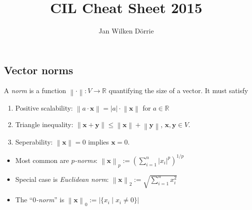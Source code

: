 \documentclass[11pt,a4paper,technote]{IEEEtran}
\newcommand{\card}[1]{\left\lvert#1\right\rvert}
\newcommand{\abs}[1]{\left\lvert#1\right\rvert}
\newcommand{\norm}[1]{\left\lVert#1\right\rVert}
\newcommand{\matr}[1]{\boldsymbol{\mathbf{#1}}}
\newcommand{\vect}[1]{\boldsymbol{\mathbf{#1}}}
\newcommand{\R}{\mathbb{R}}
\begin{document}
\title{CIL Cheat Sheet 2015}
\author{Jan Wilken D\"orrie}

\vspace{-2em}


\subsection*{Vector norms}
A \emph{norm} is a function $\norm{\cdot} : V \to \R$ quantifying the
size of a vector. It must satisfy
\begin{enumerate}
  \item Positive scalability: $\norm{a \cdot \vect{x}} = \abs{a} \cdot
    \norm{\vect{x}}$ for $a \in \R$
  \item Triangle inequality: $\norm{\vect{x} + \vect{y}} \leq
    \norm{\vect{x}} + \norm{\vect{y}}$, $\vect{x}, \vect{y} \in V$.
  \item Seperability: $\norm{\vect{x}} = 0$ implies $\vect{x} = 0$.
\end{enumerate}

\begin{itemize}
  \item Most common are \emph{$p$-norms}:
    \(
      \norm{\vect{x}}_p := {\left(\sum_{i=1}^n \abs{x_i}^p \right)}^{1/p}
    \)
  \item Special case is \emph{Euclidean norm}:
    \( \norm{\vect{x}}_2 := \sqrt{\sum_{i=1}^n x_i^2} \)
  \item The ``\emph{$0$-norm}'' is \( \norm{\vect{x}}_0 := \card{\{x_i \mid x_i
        \neq 0\}} \)
\end{itemize}
\end{document}
